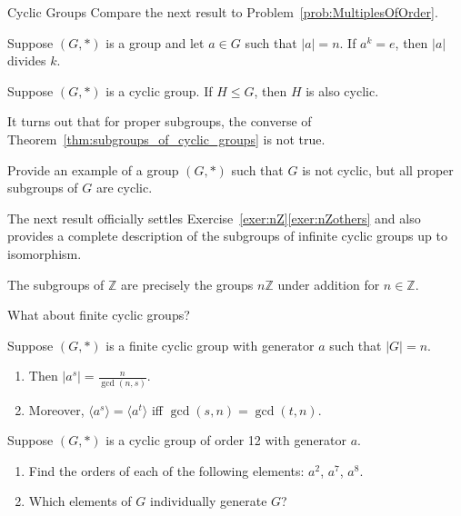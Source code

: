 \begin{section}{Cyclic Groups}
Compare the next result to Problem~\ref{prob:MultiplesOfOrder}.

\begin{corollary}
Suppose $(G,*)$ is a group and let $a\in G$ such that $|a|=n$.  If $a^k=e$, then $|a|$ divides $k$.
\end{corollary}

\begin{theorem}\label{thm:subgroups_of_cyclic_groups}
Suppose $(G,*)$ is a cyclic group. If $H\leq G$, then $H$ is also cyclic.
\end{theorem}

It turns out that for proper subgroups, the converse of Theorem~\ref{thm:subgroups_of_cyclic_groups} is not true.

\begin{exercise}
Provide an example of a group $(G,*)$ such that $G$ is not cyclic, but all proper subgroups of $G$ are cyclic.
\end{exercise}

The next result officially settles Exercise~\ref{exer:nZ}\ref{exer:nZothers} and also provides a complete description of the subgroups of infinite cyclic groups up to isomorphism.

\begin{corollary}\label{cor:subgroups_of_Z}
The subgroups of $\mathbb{Z}$ are precisely the groups $n\mathbb{Z}$ under addition for $n\in \mathbb{Z}$.
\end{corollary}

What about finite cyclic groups?

\begin{theorem}
Suppose $(G,*)$ is a finite cyclic group with generator $a$ such that $|G|=n$.  
\begin{enumerate}[label=\rm{(\alph*)}]
\item Then $\displaystyle |a^s|=\frac{n}{\gcd(n,s)}$.
\item Moreover, $\langle a^s\rangle=\langle a^t\rangle$ iff $\gcd(s,n)=\gcd(t,n)$.
\end{enumerate}
\end{theorem}

\begin{exercise}
Suppose $(G,*)$ is a cyclic group of order 12 with generator $a$. 
\begin{enumerate}[label=\rm{(\alph*)}]
\item Find the orders of each of the following elements: $a^2$, $a^7$, $a^8$.
\item Which elements of $G$ individually generate $G$?
\end{enumerate}
\end{exercise}


\end{section}
